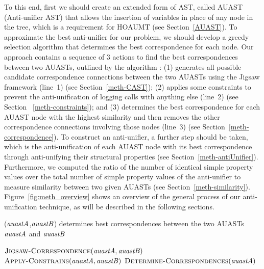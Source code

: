 To this end, first we should create an extended form of AST, called AUAST (Anti-unifier AST) that allows the insertion of variables in place of any node in the tree, which is a requirement for HOAUMT (see Section~\ref{AUAST}). To approximate the best anti-unifier for our problem, we should develop a greedy selection algorithm that determines the best correspondence for each node. Our approach contains a sequence of 3 actions to find the best correspondences between two AUASTs, outlined by the algorithm : (1) generates all possible candidate correspondence connections between the two AUASTs using the Jigsaw framework (line~1) (see Section~\ref{meth-CAST}); (2) applies some constraints to prevent the anti-unification of logging calls with anything else (line~2) (see Section ~\ref{meth-constraints}); and (3) determines the best correspondence for each AUAST node with the highest similarity and then removes the other correspondence connections involving those nodes (line~3) (see Section~\ref{meth-correspondence}). To construct an anti-unifier, a further step should be taken, which is the anti-unification of each AUAST node with its best correspondence through anti-unifying their structural properties (see Section~\ref{meth-antiUnifier}). Furthermore, we computed the ratio of the number of identical simple property values over the total number of simple property values of the anti-unifier to measure similarity between two given AUASTs (see Section~\ref{meth-similarity}). Figure~\ref{fig:meth_overview} shows an overview of the general process of our anti-unification technique, as will be described in the following sections.


\begin{algorithm}
\caption{($\mathit{auastA}$,$\mathit{auastB}$) determines best correspondences between the two AUASTs $\mathit{auastA}$ and $\mathit{auastB}$}
\label{overview}
\begin{algorithmic}[1]
\DetermineBest
   \State  $\textsc{Jigsaw-Correspondence}(\mathit{auastA},\mathit{auastB})$
   \State $\textsc{Apply-Constrains}(\mathit{auastA},\mathit{auastB})$
   \State $ \textsc{Determine-Correspondences}(\mathit{auastA})$
\end{algorithmic}
\end{algorithm}


